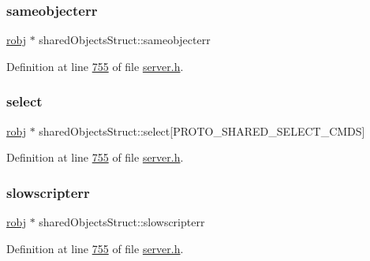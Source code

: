 \subsubsection{\texorpdfstring{sameobjecterr}{sameobjecterr}}
{\footnotesize\ttfamily \hyperlink{structredisObject}{robj} $\ast$ shared\+Objects\+Struct\+::sameobjecterr}



Definition at line \hyperlink{server_8h_source_l00755}{755} of file \hyperlink{server_8h_source}{server.\+h}.

\mbox{\label{structsharedObjectsStruct_a3e271c9b7f148eaf26d1d65d1288e6b2}} 
\subsubsection{\texorpdfstring{select}{select}}
{\footnotesize\ttfamily \hyperlink{structredisObject}{robj} $\ast$ shared\+Objects\+Struct\+::select\mbox{[}P\+R\+O\+T\+O\+\_\+\+S\+H\+A\+R\+E\+D\+\_\+\+S\+E\+L\+E\+C\+T\+\_\+\+C\+M\+DS\mbox{]}}



Definition at line \hyperlink{server_8h_source_l00755}{755} of file \hyperlink{server_8h_source}{server.\+h}.

\mbox{\label{structsharedObjectsStruct_a2282f18ab6cfcd2d60995def677b6a56}} 
\subsubsection{\texorpdfstring{slowscripterr}{slowscripterr}}
{\footnotesize\ttfamily \hyperlink{structredisObject}{robj} $\ast$ shared\+Objects\+Struct\+::slowscripterr}



Definition at line \hyperlink{server_8h_source_l00755}{755} of file \hyperlink{server_8h_source}{server.\+h}.

\mbox{\label{structsharedObjectsStruct_a5f510bfe792fb768b3c8c557c7d90f0d}} 
